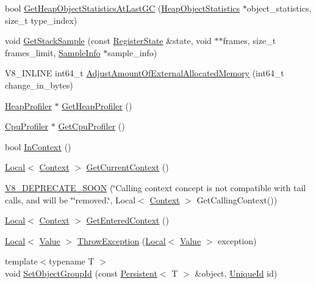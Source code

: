 \begin{DoxyCompactItemize}
\item 
bool \hyperlink{classv8_1_1_isolate_a677681d4c3abfc1bc2e8b50c23623e24}{Get\+Heap\+Object\+Statistics\+At\+Last\+GC} (\hyperlink{classv8_1_1_heap_object_statistics}{Heap\+Object\+Statistics} $\ast$object\+\_\+statistics, size\+\_\+t type\+\_\+index)
\item 
void \hyperlink{classv8_1_1_isolate_a8b173b48a477267ccd6c7d17c492b82e}{Get\+Stack\+Sample} (const \hyperlink{structv8_1_1_register_state}{Register\+State} \&state, void $\ast$$\ast$frames, size\+\_\+t frames\+\_\+limit, \hyperlink{structv8_1_1_sample_info}{Sample\+Info} $\ast$sample\+\_\+info)
\item 
V8\+\_\+\+I\+N\+L\+I\+NE int64\+\_\+t \hyperlink{classv8_1_1_isolate_aaeda5fa60961a3d9d476c46200e30711}{Adjust\+Amount\+Of\+External\+Allocated\+Memory} (int64\+\_\+t change\+\_\+in\+\_\+bytes)
\item 
\hyperlink{classv8_1_1_heap_profiler}{Heap\+Profiler} $\ast$ \hyperlink{classv8_1_1_isolate_a9c48259615e8370f6f0efd27cd7f99a6}{Get\+Heap\+Profiler} ()
\item 
\hyperlink{classv8_1_1_cpu_profiler}{Cpu\+Profiler} $\ast$ \hyperlink{classv8_1_1_isolate_a7eb415d9210d912aa57877ab6416fec8}{Get\+Cpu\+Profiler} ()
\item 
bool \hyperlink{classv8_1_1_isolate_afb6bbd31a87d0999dbbe5402447690a9}{In\+Context} ()
\item 
\hyperlink{classv8_1_1_local}{Local}$<$ \hyperlink{classv8_1_1_context}{Context} $>$ \hyperlink{classv8_1_1_isolate_afa1b6cde5a7a7cfde87eaabc4ab34062}{Get\+Current\+Context} ()
\item 
\hyperlink{classv8_1_1_isolate_adf1b08359e4162ee05caab23377dbc9d}{V8\+\_\+\+D\+E\+P\+R\+E\+C\+A\+T\+E\+\_\+\+S\+O\+ON} (\char`\"{}Calling context concept is not compatible with tail calls, and will be \char`\"{}\char`\"{}removed.\char`\"{}, Local$<$ \hyperlink{classv8_1_1_context}{Context} $>$ Get\+Calling\+Context())
\item 
\hyperlink{classv8_1_1_local}{Local}$<$ \hyperlink{classv8_1_1_context}{Context} $>$ \hyperlink{classv8_1_1_isolate_aff9eb2f5d199f8fcf59d9699194cd2e3}{Get\+Entered\+Context} ()
\item 
\hyperlink{classv8_1_1_local}{Local}$<$ \hyperlink{classv8_1_1_value}{Value} $>$ \hyperlink{classv8_1_1_isolate_aba648b3c00dc9f1ef2a22195d99e22e8}{Throw\+Exception} (\hyperlink{classv8_1_1_local}{Local}$<$ \hyperlink{classv8_1_1_value}{Value} $>$ exception)
\item 
{\footnotesize template$<$typename T $>$ }\\void \hyperlink{classv8_1_1_isolate_ae4418cb238686a321aa406e90c72fab5}{Set\+Object\+Group\+Id} (const \hyperlink{classv8_1_1_persistent}{Persistent}$<$ T $>$ \&object, \hyperlink{classv8_1_1_unique_id}{Unique\+Id} id)
$$
\end{DoxyCompactItemize}
